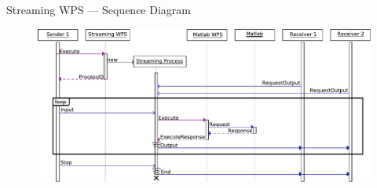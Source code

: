 \documentclass[xcolor=svgnames,professionalfonts,11pt,aspectratio=43,handout]{beamer}
\begin{document}


\begin{frame}[c,fragile,label=sequencediagram]{Streaming WPS --- Sequence Diagram}
  \begin{figure}
    \begin{center}
      \includegraphics[width=\textwidth]{figures/sequence-diagram2.pdf}
    \end{center}
  \end{figure}
\end{frame}

%      
\end{document}
